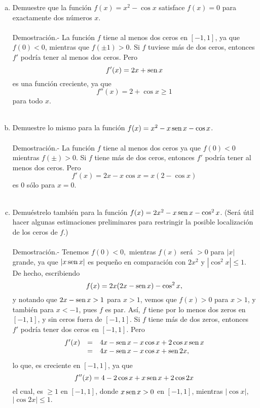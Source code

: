 \begin{enumerate}[\bfseries 1.]
\begin{enumerate}[(a)]
	    \item Demuestre que la función $f(x)=x^2-\cos x$ satisface $f(x)=0$ para exactamente dos números $x$.\\\\
		Demostración.-\; La función $f$ tiene al menos dos ceros en $[-1,1]$, ya que $f(0)<0$, mientras que $f(\pm 1)>0.$ Si $f$ tuviese más de dos ceros, entonces $f'$ podría tener al menos dos ceros. Pero
		$$f'(x)=2x+\mathop{\mbox{\normalfont sen}}\nolimits x$$
		es una función creciente, ya que
		$$f''(x)=2+\cos x\geq 1$$
		para todo $x$.\\\\

	    \item Demuestre lo mismo para la función $f(x)=x^2-x\mathop{\mbox{\normalfont sen}}\nolimits x - \cos x$.\\\\
		Demostración.-\; La función $f$ tiene al menos dos ceros ya que $f(0)<0$ mientras $f(\pm)>0.$ Si $f$ tiene más de dos ceros, entonces $f'$ podría tener al menos dos ceros. Pero
		$$f'(x)=2x-x\cos x = x(2-\cos x)$$
		es $0$ sólo para $x=0$.\\\\

	    \item Demuéstrelo también para la función $f(x)=2x^2-x\mathop{\mbox{\normalfont sen}}\nolimits x - \cos^2 x$. (Será útil hacer algunas estimaciones preliminares para restringir la posible localización de los ceros de $f$.)\\\\
		Demostración.-\; Tenemos $f(0)<0,$ mientras $f(x)$ será $>0$ para $|x|$ grande, ya que $|x\mathop{\mbox{\normalfont sen}}\nolimits x|$ es pequeño en comparación con $2x^2$ y $|\cos^2 x|\leq 1.$ De hecho, escribiendo 
		$$f(x)=2x(2x-\mathop{\mbox{\normalfont sen}}\nolimits x)-\cos^2 x,$$
		y notando que $2x-\mathop{\mbox{\normalfont sen}}\nolimits x >1$ para $x>1$, vemos que $f(x)>0$ para $x>1$, y también para $x<-1$, pues $f$ es par. Así, $f$ tiene por lo menos dos zeros en $[-1,1]$, y sin ceros fuera de $[-1,1]$. Si $f$ tiene más de dos zeros, entonces $f'$ podría tener dos ceros en $[-1,1]$. Pero
		$$\begin{array}{rcl}
		    f'(x)&=&4x-\mathop{\mbox{\normalfont sen}}\nolimits x-x\cos x + 2\cos x \mathop{\mbox{\normalfont sen}}\nolimits x\\
			 &=& 4x-\mathop{\mbox{\normalfont sen}}\nolimits x - x\cos x+\mathop{\mbox{\normalfont sen}}\nolimits 2x,
		\end{array}$$
		lo que, es creciente en $[-1,1]$, ya que
		$$f''(x)=4-2\cos x+x\mathop{\mbox{\normalfont sen}}\nolimits x+2\cos 2x$$
		el cual, es $\geq 1$ en $[-1,1]$, donde $x\mathop{\mbox{\normalfont sen}}\nolimits x>0$ en $[-1,1]$, mientras $|\cos x|,$ $|\cos 2x|\leq 1.$\\\\


\end{enumerate}
\end{enumerate}
